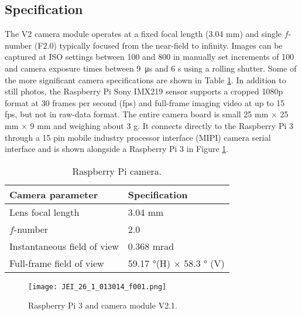\subsection{Specification}
\label{ssec:raspcamspecification}
The V2 camera module operates at a fixed focal length (3.04 \si{\milli\meter})
and single $f$-number (F$2.0$) typically focused from the near-field to
infinity. Images can be captured at ISO settings between 100 and 800 in manually
set increments of 100
and camera exposure times between \SI{9}{\micro\second} and 6 \si{\second} using
a rolling shutter. Some of the more significant camera specifications are shown
in Table \ref{tab:raspicamspec2}. In addition to still photos, the Raspberry Pi
Sony IMX219 sensor supports a cropped 1080p format at 30 frames per second (fps)
and full-frame imaging video at up to 15 fps, but not in raw-data format. The
entire camera board is small 25 \si{\milli\meter} $\times$ 25 \si{\milli\meter}
$\times$ 9 \si{\milli\meter} and weighing about $3$ \si{\gram}. It connects
directly to the Raspberry Pi 3 through a 15 pin mobile industry processor
interface (MIPI) camera serial interface and is shown alongside a Raspberry Pi 3
in Figure \ref{fig:boardcam}.\cite{upton2016raspberry, raspberrycam}
%
\begin{table}[htb]
	\centering
	\caption{Raspberry Pi camera.}
	\label{tab:raspicamspec2}
	\begin{tabular}{l l}
		\hline
		\textbf{Camera parameter}			& 	\textbf{Specification}\\
		\hline
		Lens focal length 	& 	3.04 \si{\milli\meter}	\\
		$f$-number			&	2.0	\\
		Instantaneous field of view	&	0.368 \si{\milli\radian}\\
		Full-frame field of view & 59.17 \si{\degree}(H) $\times$ 58.3 \si{\degree} (V)\\
		\hline
	\end{tabular}
\end{table}
%

\begin{figure}[htb]
	\centering
    \texttt{[image: JEI\_26\_1\_013014\_f001.png]}
    \caption{Raspberry Pi 3 and camera module V2.1.}
    \label{fig:boardcam}
\end{figure}